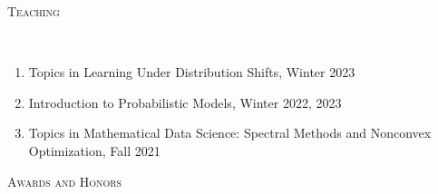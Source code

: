 \documentclass[a4paper, 10pt]{article}
\newenvironment{changemargin}[2]{%
  \begin{list}{}{%
    \setlength{\topsep}{0pt}%
    \setlength{\leftmargin}{#1}%
    \setlength{\rightmargin}{#2}%
    \setlength{\listparindent}{\parindent}%
    \setlength{\itemindent}{\parindent}%
    \setlength{\parsep}{\parskip}%
  }%
  \item[]}{\end{list}
}
\newcommand{\lineover}{
	\begin{changemargin}{-0.05in}{-0.05in}
		\vspace*{-8pt}
		\hrulefill \\
		\vspace*{-2pt}
	\end{changemargin}
}
\newcommand{\header}[1]{
	\begin{changemargin}{-0.5in}{-0.5in}
		\scshape{#1}\\
  	\lineover
	\end{changemargin}
}
\newenvironment{body} {
	\vspace*{-16pt}
	\begin{changemargin}{-0.3in}{-0.5in}
  }	
	{\end{changemargin}
}
\begin{document}
%
\bigskip
\header{\LARGE{Teaching}}
\begin{body}
	\vspace{18pt}
	\begin{enumerate}
	\item Topics in Learning Under Distribution Shifts, Winter 2023
	\item Introduction to Probabilistic Models, Winter 2022, 2023
	\item Topics in Mathematical Data Science: Spectral Methods and Nonconvex Optimization, Fall 2021 
	\end{enumerate}
\end{body}


%

\bigskip

\header{\LARGE{Awards and Honors}}
\end{document}
